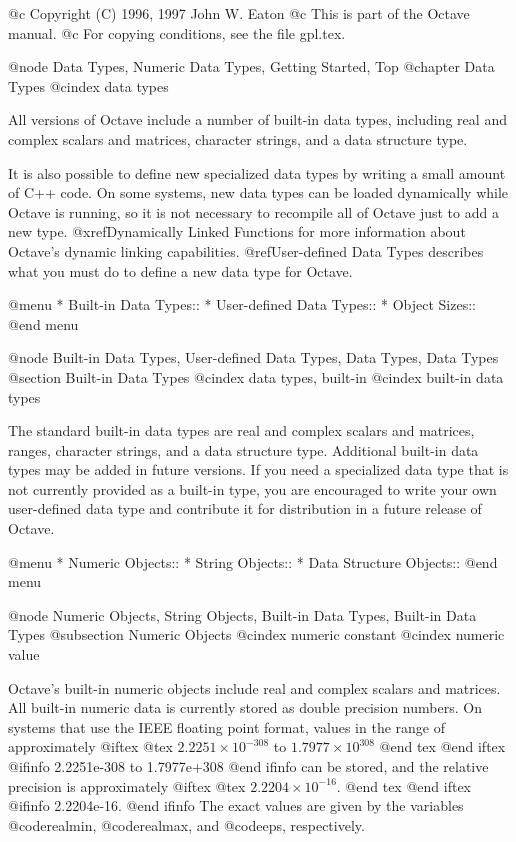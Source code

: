@c Copyright (C) 1996, 1997 John W. Eaton
@c This is part of the Octave manual.
@c For copying conditions, see the file gpl.tex.

@node Data Types, Numeric Data Types, Getting Started, Top
@chapter Data Types
@cindex data types

All versions of Octave include a number of built-in data types,
including real and complex scalars and matrices, character strings, and
a data structure type.

It is also possible to define new specialized data types by writing a
small amount of C++ code.  On some systems, new data types can be loaded
dynamically while Octave is running, so it is not necessary to recompile
all of Octave just to add a new type.  @xref{Dynamically Linked
Functions} for more information about Octave's dynamic linking
capabilities.  @ref{User-defined Data Types} describes what you must do
to define a new data type for Octave.

@menu
* Built-in Data Types::         
* User-defined Data Types::     
* Object Sizes::                
@end menu

@node Built-in Data Types, User-defined Data Types, Data Types, Data Types
@section Built-in Data Types
@cindex data types, built-in
@cindex built-in data types

The standard built-in data types are real and complex scalars and
matrices, ranges, character strings, and a data structure type.
Additional built-in data types may be added in future versions.  If you
need a specialized data type that is not currently provided as a
built-in type, you are encouraged to write your own user-defined data
type and contribute it for distribution in a future release of Octave.

@menu
* Numeric Objects::             
* String Objects::              
* Data Structure Objects::      
@end menu

@node Numeric Objects, String Objects, Built-in Data Types, Built-in Data Types
@subsection Numeric Objects
@cindex numeric constant
@cindex numeric value

Octave's built-in numeric objects include real and complex scalars and
matrices.  All built-in numeric data is currently stored as double
precision numbers.  On systems that use the IEEE floating point format,
values in the range of approximately
@iftex
@tex
 $2.2251\times10^{-308}$ to $1.7977\times10^{308}$
@end tex
@end iftex
@ifinfo
 2.2251e-308 to 1.7977e+308
@end ifinfo
 can be stored, and the relative precision is approximately
@iftex
@tex
 $2.2204\times10^{-16}$.
@end tex
@end iftex
@ifinfo
 2.2204e-16.
@end ifinfo
The exact values are given by the variables @code{realmin},
@code{realmax}, and @code{eps}, respectively.

